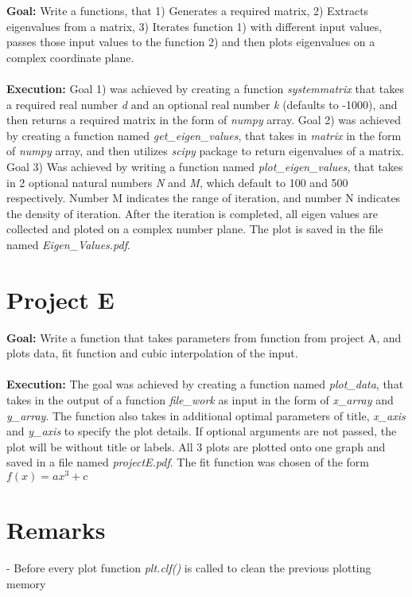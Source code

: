 \documentclass[a4paper,12pt]{article}
\begin{document}
\textbf{Goal:} Write a functions, that 1) Generates a required matrix, 2) Extracts eigenvalues from a matrix, 3) Iterates function 1) with different input values, passes those input values to the function 2) and then plots eigenvalues on a complex coordinate plane. \\ \\ \textbf{Execution:} Goal 1) was achieved by creating a function \textit{systemmatrix} that takes a required real number \textit{d} and an optional real number \textit{k} (defaults to -1000), and then returns a required matrix in the form of \textit{numpy} array. Goal 2) was achieved by creating a function named \textit{get\_eigen\_values}, that takes in \textit{matrix} in the form of \textit{numpy} array, and then utilizes \textit{scipy} package to return eigenvalues of a matrix. Goal 3) Was achieved by writing a function named \textit{plot\_eigen\_values}, that takes in 2 optional natural numbers \textit{N} and \textit{M}, which default to 100 and 500 respectively. Number M indicates the range of iteration, and number N indicates the density of iteration. After the iteration is completed, all eigen values are collected and ploted on a complex number plane. The plot is saved in the file named \textit{Eigen\_Values.pdf}.

\section{Project E}

\textbf{Goal:} Write a function that takes parameters from function from project A, and plots data, fit function and cubic interpolation of the input. \\ \\ \textbf{Execution:} The goal was achieved by creating a function named \textit{plot\_data}, that takes in the output of a function \textit{file\_work} as input in the form of \textit{x\_array} and \textit{y\_array}. The function also takes in additional optimal parameters of title, \textit{x\_axis} and \textit{y\_axis} to specify the plot details. If optional arguments are not passed, the plot will be without title or labels. All 3 plots are plotted onto one graph and saved in a file named \textit{projectE.pdf}. The fit function was chosen of the form $f(x)=ax^{3}+c$

\section{Remarks}

- Before every plot function \textit{plt.clf()} is called to clean the previous plotting memory 
\end{document}

